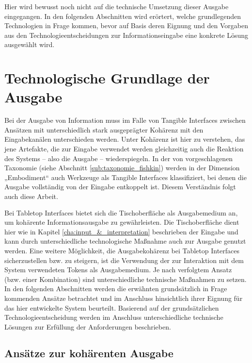 Hier wird bewusst noch nicht auf die technische Umsetzung dieser Ausgabe eingegangen. In den folgenden Abschnitten wird erörtert, welche grundlegenden Technologien in Frage kommen, bevor auf Basis deren Eignung und den Vorgaben aus den Technologieentscheidungen zur Informationseingabe eine konkrete Lösung ausgewählt wird.


\section{Technologische Grundlage der Ausgabe} %
\label{sec:technologische_grundlage_der_visualisierung}

Bei der Ausgabe von Information muss im Falle von Tangible Interfaces zwischen Ansätzen mit unterschiedlich stark ausgeprägter Kohärenz mit den Eingabekanälen unterschieden werden. Unter Kohärenz ist hier zu verstehen, das jene Artefakte, die zur Eingabe verwendet werden gleichzeitig auch die Reaktion des Systems -- also die Ausgabe -- wiederspiegeln. In der von \citet{Fishkin04} vorgeschlagenen Taxonomie (siehe Abschnitt \ref{sub:taxonomie_fishkin}) werden in der Dimension „Embodiment“ auch Werkzeuge als Tangible Interfaces klassifiziert, bei denen die Ausgabe vollständig von der Eingabe entkoppelt ist. Diesem Verständnis folgt auch diese Arbeit.

Bei Tabletop Interfaces bietet sich die Tischoberfläche als Ausgabemedium an, um kohärente Informationsausgabe zu gewährleisten. Die Tischoberfläche dient hier wie in Kapitel \ref{cha:input_&_interpretation} beschrieben der Eingabe und kann durch unterschiedliche technologische Maßnahme auch zur Ausgabe genutzt werden. Eine weitere Möglichkeit, die Ausgabekohärenz bei Tabletop Interfaces sicherzustellen bzw. zu steigern, ist die Verwendung der zur Interaktion mit dem System verwendeten Tokens als Ausgabemedium. Je nach verfolgtem Ansatz (bzw. einer Kombination) sind unterschiedliche technische Maßnahmen zu setzen. In den folgenden Abschnitten werden die erwähnten grundsätzlich in Frage kommenden Ansätze betrachtet und im Anschluss hinsichtlich ihrer Eignung für das hier entwickelte System beurteilt. Basierend auf der grundsätzlichen Technologieentscheidung werden im Anschluss unterschiedliche technische Lösungen zur Erfüllung der Anforderungen beschrieben.

\subsection{Ansätze zur kohärenten Ausgabe} %
\label{sub:kohärente_ausgabe}

